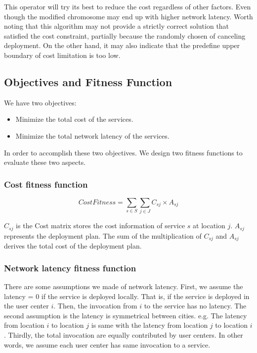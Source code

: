 \documentclass{llncs}
\begin{document}
This operator will try its best to reduce the cost regardless of other factors. Even though the modified 
chromosome may end up with higher network latency.
Worth noting that this algorithm may not provide a strictly correct solution that satisfied the cost constraint, 
partially because the randomly chosen of canceling deployment. On the other hand, it may also indicate that 
the predefine upper boundary of cost limitation is too low.



\subsection{Objectives and Fitness Function}
We have two objectives:
\begin{itemize}
	\item Minimize the total cost of the services.
	\item Minimize the total network latency of the services.
\end{itemize}


\begin{flushleft}In order to accomplish these two objectives. We design two fitness functions to evaluate these two aspects.\end{flushleft}
\subsubsection{Cost fitness function}
\begin{center}
	\begin{equation}
		CostFitness = \sum\limits_{s \in S} \sum\limits_{j \in J} C_{sj} \times A_{sj}
	\end{equation}
\end{center}

$C_{sj}$ is the Cost matrix stores the cost information of service $s$ at location $j$. $A_{sj}$ represents the deployment plan. The sum of the multiplication of 
$C_{sj}$ and $A_{sj}$ derives the total cost of the deployment plan.

\subsubsection{Network latency fitness function}

There are some assumptions we made of network latency. First, we assume
the latency = 0 if the service is deployed locally. That is, if the service is deployed in the user center $i$. Then, the 
invocation from $i$ to the service has no latency. The second assumption is the latency is symmetrical between cities. e.g. 
The latency from location $i$ to location $j$ is same with the latency from location $j$ to location $i$. Thirdly, the total invocation are equally
contributed by user centers. In other words, we assume each user center has same invocation to a service.
\end{document}
